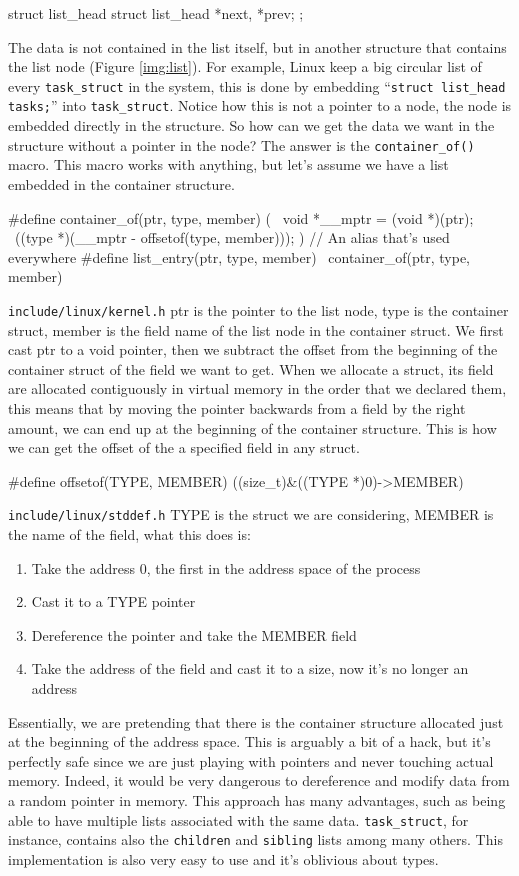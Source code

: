 \documentclass[10pt]{book}
\begin{document}
\begin{code}
struct list_head {
	struct list_head *next, *prev;
};
\end{code}
The data is not contained in the list itself, but in another structure that contains the list node (Figure \ref{img:list}). For example, Linux keep a big circular list of every \verb|task_struct| in the system, this is done by embedding ``\verb|struct list_head tasks;|'' into \verb|task_struct|. Notice how this is not a pointer to a node, the node is embedded directly in the structure. So how can we get the data we want in the structure without a pointer in the node? The answer is the \verb|container_of()| macro. This macro works with anything, but let's assume we have a list embedded in the container structure.
\begin{code}
#define container_of(ptr, type, member) ({ \
	void *__mptr = (void *)(ptr); \
	((type *)(__mptr - offsetof(type, member))); })
// An alias that's used everywhere
#define list_entry(ptr, type, member) \
        container_of(ptr, type, member)
\end{code}
\verb|include/linux/kernel.h|
ptr is the pointer to the list node, type is the container struct, member is the field name of the list node in the container struct. We first cast ptr to a void pointer, then we subtract the offset from the beginning of the container struct of the field we want to get. When we allocate a struct, its field are allocated contiguously in virtual memory in the order that we declared them, this means that by moving the pointer backwards from a field by the right amount, we can end up at the beginning of the container structure. This is how we can get the offset of the a specified field in any struct. 
\begin{code}
#define offsetof(TYPE, MEMBER) ((size_t)&((TYPE *)0)->MEMBER)
\end{code}
\verb|include/linux/stddef.h|
TYPE is the struct we are considering, MEMBER is the name of the field, what this does is:
\begin{enumerate}
    \item Take the address 0, the first in the address space of the process
    \item Cast it to a TYPE pointer 
    \item Dereference the pointer and take the MEMBER field
    \item Take the address of the field and cast it to a size, now it's no longer an address
\end{enumerate}
Essentially, we are pretending that there is the container structure allocated just at the beginning of the address space. This is arguably a bit of a hack, but it's perfectly safe since we are just playing with pointers and never touching actual memory. Indeed, it would be very dangerous to dereference and modify data from a random pointer in memory. This approach has many advantages, such as being able to have multiple lists associated with the same data. \verb|task_struct|, for instance, contains also the \verb|children| and \verb|sibling| lists among many others. This implementation is also very easy to use and it's oblivious about types.
\end{document}
